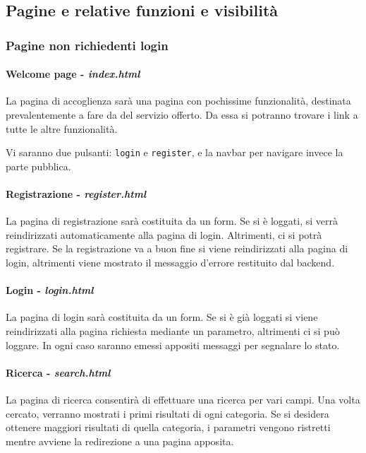 \subsection{Pagine e relative funzioni e visibilità}
\subsubsection{Pagine non richiedenti login}
\paragraph{Welcome page - \textit{index.html}}
La pagina di accoglienza sarà una pagina con pochissime funzionalità, destinata prevalentemente a fare da  del servizio offerto. Da essa si potranno trovare i link a tutte le altre funzionalità.

Vi saranno due pulsanti: \verb|login| e \verb|register|, e la navbar per navigare invece la parte pubblica.

\paragraph{Registrazione - \textit{register.html}}
La pagina di registrazione sarà costituita da un form. Se si è loggati, si verrà reindirizzati automaticamente alla pagina di login. Altrimenti, ci si potrà registrare. Se la registrazione va a buon fine si viene reindirizzati alla pagina di login, altrimenti viene mostrato il messaggio d'errore restituito dal backend.

\paragraph{Login - \textit{login.html}}
La pagina di login sarà costituita da un form. Se si è già loggati si viene reindirizzati alla pagina richiesta mediante un parametro, altrimenti ci si può loggare. In ogni caso saranno emessi appositi messaggi per segnalare lo stato.

\paragraph{Ricerca - \textit{search.html}}
La pagina di ricerca consentirà di effettuare una ricerca per vari campi. Una volta cercato, verranno mostrati i primi risultati di ogni categoria. Se si desidera ottenere maggiori risultati di quella categoria, i parametri vengono ristretti mentre avviene la redirezione a una pagina apposita.

